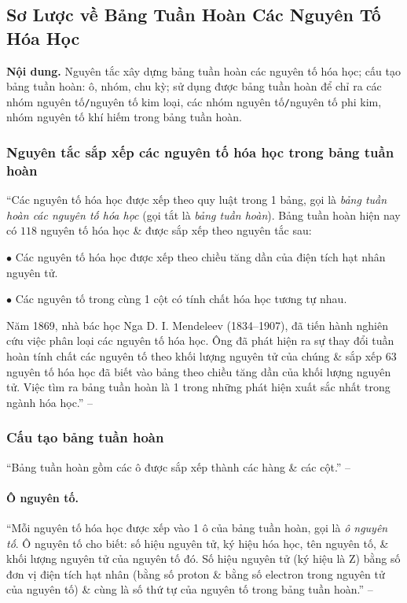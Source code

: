 \documentclass{article}
\numberwithin{equation}{section}
\begin{document}

\subsection{Sơ Lược về Bảng Tuần Hoàn Các Nguyên Tố Hóa Học}
\textsf{\textbf{Nội dung.} Nguyên tắc xây dựng bảng tuần hoàn các nguyên tố hóa học; cấu tạo bảng tuần hoàn: ô, nhóm, chu kỳ; sử dụng được bảng tuần hoàn để chỉ ra các nhóm nguyên tố\texttt{/}nguyên tố kim loại, các nhóm nguyên tố\texttt{/}nguyên tố phi kim, nhóm nguyên tố khí hiếm trong bảng tuần hoàn.}

\subsubsection{Nguyên tắc sắp xếp các nguyên tố hóa học trong bảng tuần hoàn}
``Các nguyên tố hóa học được xếp theo quy luật trong 1 bảng, gọi là \textit{bảng tuần hoàn các nguyên tố hóa học} (gọi tắt là \textit{bảng tuần hoàn}). Bảng tuần hoàn hiện nay có $118$ nguyên tố hóa học \& được sắp xếp theo nguyên tắc sau:
\begin{enumerate*}
	\item[$\bullet$] Các nguyên tố hóa học được xếp theo chiều tăng dần của điện tích hạt nhân nguyên tử.
	\item[$\bullet$] Các nguyên tố trong cùng 1 cột có tính chất hóa học tương tự nhau.
\end{enumerate*}
Năm 1869, nhà bác học Nga D. I. Mendeleev (1834--1907), đã tiến hành nghiên cứu việc phân loại các nguyên tố hóa học. Ông đã phát hiện ra sự thay đổi tuần hoàn tính chất các nguyên tố theo khối lượng nguyên tử của chúng \& sắp xếp $63$ nguyên tố hóa học đã biết vào bảng theo chiều tăng dần của khối lượng nguyên tử. Việc tìm ra bảng tuần hoàn là 1 trong những phát hiện xuất sắc nhất trong ngành hóa học.'' -- \cite[p. 20]{SGK_KHTN_7_Canh_Dieu}

\subsubsection{Cấu tạo bảng tuần hoàn}
``Bảng tuần hoàn gồm các ô được sắp xếp thành các hàng \& các cột.'' -- \cite[p. 20]{SGK_KHTN_7_Canh_Dieu}

\paragraph{Ô nguyên tố.} ``Mỗi nguyên tố hóa học được xếp vào 1 ô của bảng tuần hoàn, gọi là \textit{ô nguyên tố}. Ô nguyên tố cho biết: số hiệu nguyên tử, ký hiệu hóa học, tên nguyên tố, \& khối lượng nguyên tử của nguyên tố đó. Số hiệu nguyên tử (ký hiệu là Z) bằng số đơn vị điện tích hạt nhân (bằng số proton \& bằng số electron trong nguyên tử của nguyên tố) \& cùng là số thứ tự của nguyên tố trong bảng tuần hoàn.'' -- \cite[p. 20]{SGK_KHTN_7_Canh_Dieu}
\end{document}
